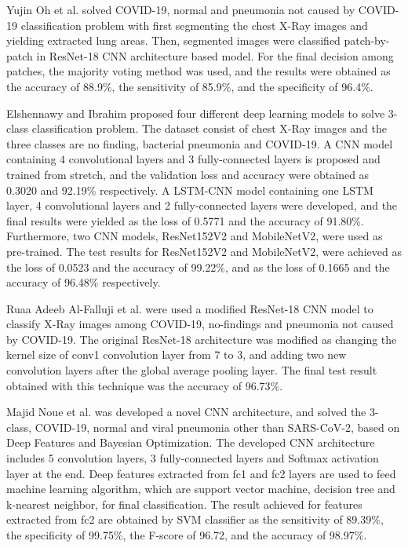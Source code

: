 Yujin Oh et al. \cite{literature_oh} solved COVID-19, normal and pneumonia not caused by COVID-19 classification problem with first segmenting the chest X-Ray images and yielding extracted lung areas. Then, segmented images were classified patch-by-patch in ResNet-18 CNN architecture based model. For the final decision among patches, the majority voting method was used, and the results were obtained as the accuracy of 88.9\%, the sensitivity of 85.9\%, and the specificity of 96.4\%.

Elshennawy and Ibrahim \cite{literature_elshennawy} proposed four different deep learning models to solve 3-class classification problem. The dataset consist of chest X-Ray images and the three classes are no finding, bacterial pneumonia and COVID-19. A CNN model containing 4 convolutional layers and 3 fully-connected layers is proposed and trained from stretch, and the validation loss and accuracy were obtained as 0.3020 and 92.19\% respectively. A LSTM-CNN model containing one LSTM layer, 4 convolutional layers and 2 fully-connected layers were developed, and the final results were yielded as the loss of 0.5771 and the accuracy of 91.80\%. Furthermore, two CNN models, ResNet152V2 and MobileNetV2, were used as pre-trained. The test results for ResNet152V2 and MobileNetV2, were achieved as the loss of 0.0523 and the accuracy of 99.22\%, and as the loss of 0.1665 and the accuracy of 96.48\% respectively.

Ruaa Adeeb Al-Falluji et al. \cite{literature_Al-Falluji} were used a modified ResNet-18 CNN model to classify X-Ray images among COVID-19, no-findings and pneumonia not caused by COVID-19. The original ResNet-18 architecture was modified as changing the kernel size of conv1 convolution layer from 7 to 3, and adding two new convolution layers after the global average pooling layer. The final test result obtained with this technique was the accuracy of 96.73\%.

Majid Noue et al. \cite{A_novelCNNModel} was developed a novel CNN architecture, and solved the 3-class, COVID-19, normal and viral pneumonia other than SARS-CoV-2, based on Deep Features and Bayesian Optimization. The developed CNN architecture includes 5 convolution layers, 3 fully-connected layers and Softmax activation layer at the end. Deep features extracted from fc1 and fc2 layers are used to feed machine learning algorithm, which are support vector machine, decision tree and k-nearest neighbor, for final classification. The result achieved for features extracted from fc2 are obtained by SVM classifier as the sensitivity of 89.39\%, the specificity of 99.75\%, the F-score of 96.72, and the accuracy of 98.97\%.

